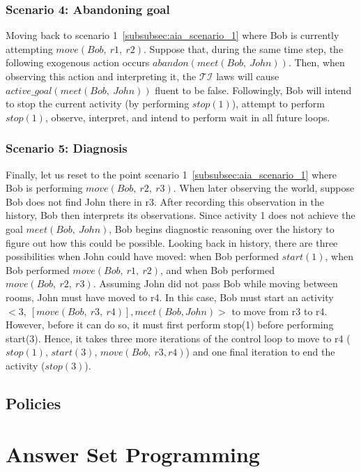 \subsubsection{Scenario 4: Abandoning goal~\cite{blount_towards_2014}}
\label{subsubsec:aia_scenario_4}

Moving back to scenario 1~\ref{subsubsec:aia_scenario_1} where Bob is currently attempting $move(Bob,\ r1,\ r2)$.
Suppose that, during the same time step, the following exogenous action occurs $abandon(meet(Bob,\ John))$.
Then, when observing this action and interpreting it, the $\mathcal{TI}$ laws will cause $active\_goal(meet(Bob,\ John))$ fluent to be false.
Followingly, Bob will intend to stop the current activity (by performing $stop(1)$), attempt to perform $stop(1)$, observe, interpret, and intend to perform wait in all future loops.

\subsubsection{Scenario 5: Diagnosis~\cite{blount_towards_2014}}
\label{subsubsec:aia_scenario_5}

Finally, let us reset to the point scenario 1~\ref{subsubsec:aia_scenario_1} where Bob is performing $move(Bob,\ r2,\ r3)$.
When later observing the world, suppose Bob does not find John there in r3.
After recording this observation in the history, Bob then interprets its observations.
Since activity 1 does not achieve the goal $meet(Bob,\ John)$, Bob begins diagnostic reasoning over the history to figure out how this could be possible.
Looking back in history, there are three possibilities when John could have moved: when Bob performed $start(1)$, when Bob performed $move(Bob,\ r1,\ r2)$, and when Bob performed $move(Bob,\ r2,\ r3)$.
Assuming John did not pass Bob while moving between rooms, John must have moved to r4.
In this case, Bob must start an activity $<3,\ [move(Bob,\ r3,\ r4)],meet(Bob,John)>$ to move from r3 to r4.
However, before it can do so, it must first perform stop(1) before performing start(3).
Hence, it takes three more iterations of the control loop to move to r4 ($stop(1)$, $start(3)$, $move(Bob,\ r3,r4)$) and one final iteration to end the activity ($stop(3)$).

\subsection{Policies}
\label{subsec:policies}

\section{Answer Set Programming}
\label{sec:asp}
